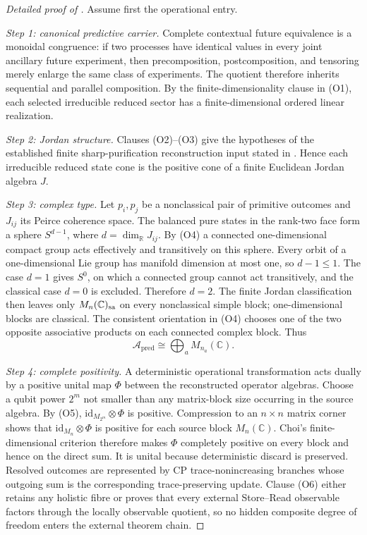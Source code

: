 \documentclass[11pt]{article}
\theoremstyle{definition}
\theoremstyle{remark}
\newcommand{\R}{\mathbb R}
\newcommand{\C}{\mathbb C}
\newcommand{\id}{\mathrm{id}}
\newcommand{\A}{\mathcal A}
\newcommand{\pred}{\mathrm{pred}}
\begin{document}
\begin{proof}[Detailed proof of ]
Assume first the operational entry.

\emph{Step 1: canonical predictive carrier.}
Complete contextual future equivalence is a monoidal congruence: if two
processes have identical values in every joint ancillary future experiment,
then precomposition, postcomposition, and tensoring merely enlarge the same
class of experiments.  The quotient therefore inherits sequential and parallel
composition.  By the finite-dimensionality clause in
\textup{(O1)}, each selected irreducible reduced
sector has a finite-dimensional ordered linear realization.

\emph{Step 2: Jordan structure.}
Clauses \textup{(O2)}--\textup{(O3)} give the hypotheses of the established
finite sharp-purification reconstruction input stated in
.  Hence each irreducible reduced state cone is the
positive cone of a finite Euclidean Jordan algebra $J$.

\emph{Step 3: complex type.}
Let $p_i,p_j$ be a nonclassical pair of primitive outcomes and $J_{ij}$ its
Peirce coherence space.  The balanced pure states in the rank-two face form a
sphere $S^{d-1}$, where $d=\dim_{\R}J_{ij}$.  By \textup{(O4)} a connected
one-dimensional compact group acts effectively and transitively on this
sphere.  Every orbit of a one-dimensional Lie group has manifold dimension at
most one, so $d-1\le1$.  The case $d=1$ gives $S^0$, on which a connected group
cannot act transitively, and the classical case $d=0$ is excluded.  Therefore
$d=2$.  The finite Jordan classification then leaves only
$M_n(\C)_{\rm sa}$ on every nonclassical simple block; one-dimensional blocks
are classical.  The consistent orientation in \textup{(O4)} chooses one of the
two opposite associative products on each connected complex block.  Thus
\[
  \A_{\pred}\cong\bigoplus_a M_{n_a}(\C).
\]

\emph{Step 4: complete positivity.}
A deterministic operational transformation acts dually by a positive unital
map $\Phi$ between the reconstructed operator algebras.  Choose a qubit power
$2^m$ not smaller than any matrix-block size occurring in the source algebra.
By \textup{(O5)}, $\id_{M_{2^m}}\otimes\Phi$ is positive.  Compression to an
$n\times n$ matrix corner shows that $\id_{M_n}\otimes\Phi$ is positive for
each source block $M_n(\C)$.  Choi's finite-dimensional criterion therefore
makes $\Phi$ completely positive on every block and hence on the direct sum.
It is unital because deterministic discard is preserved.  Resolved outcomes
are represented by CP trace-nonincreasing branches whose outgoing sum is the
corresponding trace-preserving update.  Clause \textup{(O6)} either retains any
holistic fibre or proves that every external Store--Read observable factors
through the locally observable quotient, so no hidden composite degree of
freedom enters the external theorem chain.


\end{proof}
\end{document}

